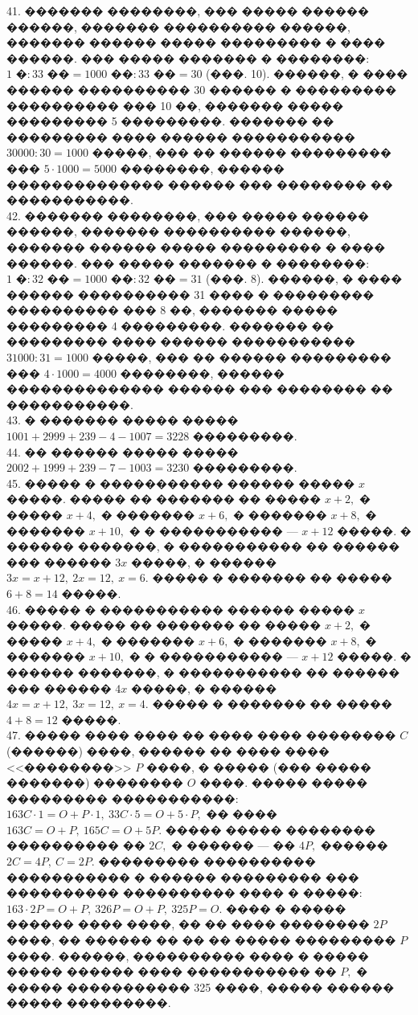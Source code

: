 \documentclass[12pt]{article}
\begin{document}
41. ������� ��������, ��� ����� ������ ������, ������� ���������� ������, ������� ������ ����� ��������� � ���� ������. ��� ����� ������� � ��������:
$1\text{ �}:33\text{ ��}=1000\text{ ��}:33\text{ ��}=30$ (���. 10). ������, � ���� ������ ���������� 30 ������ � ��������� ���������� ��� 10 ��, ������� ����� ��������� 5 ���������. ������� �� ��������� ���� ������ ����������� $30000:30=1000$ �����, ��� �� ������ ��������� ��� $5\cdot1000=5000$ ��������, ������ �������������� ������ ��� �������� �� �����������.\\
42. ������� ��������, ��� ����� ������ ������, ������� ���������� ������, ������� ������ ����� ��������� � ���� ������. ��� ����� ������� � ��������:
$1\text{ �}:32\text{ ��}=1000\text{ ��}:32\text{ ��}=31$ (���. 8). ������, � ���� ������ ���������� 31 ���� � ��������� ���������� ��� 8 ��, ������� ����� ��������� 4 ���������. ������� �� ��������� ���� ������ ����������� $31000:31=1000$ �����, ��� �� ������ ��������� ��� $4\cdot1000=4000$ ��������, ������ �������������� ������ ��� �������� �� �����������.\\
43. � ������� ����� ����� $1001+2999+239-4-1007=3228$ ���������.\\
44. �� ������ ����� ����� $2002+1999+239-7-1003=3230$ ���������.\\
45. ����� � ����������� ������ ����� $x$ �����. ����� �� ������� �� ����� $x+2,$ � ����� $x+4,$ � ������� $x+6,$ � ������� $x+8,$ � ������� $x+10,$ � � ����������� --- $x+12$ �����. � ������ �������, � ����������� �� ������ ��� ������ $3x$ �����, � ������ $3x=x+12,\ 2x=12,\ x=6.$ ����� � ������� �� ����� $6+8=14$ �����.\\
46. ����� � ����������� ������ ����� $x$ �����. ����� �� ������� �� ����� $x+2,$ � ����� $x+4,$ � ������� $x+6,$ � ������� $x+8,$ � ������� $x+10,$ � � ����������� --- $x+12$ �����. � ������ �������, � ����������� �� ������ ��� ������ $4x$ �����, � ������ $4x=x+12,\ 3x=12,\ x=4.$ ����� � ������� �� ����� $4+8=12$ �����.\\
47. ����� ���� ���� �� ���� ���� �������� $C$ (������) ����, ������ �� ���� ���� <<��������>> $P$ ����, � ����� (��� ����� �������) �������� $O$ ����. ����� ����� ��������� �����������: $163C\cdot1=O+P\cdot1,\ 33C\cdot5=O+5\cdot P,$ �� ���� $163C=O+P,\ 165C=O+5P.$ ����� ����� �������� ���������� �� $2C,$ � ������ --- �� $4P,$ ������ $2C=4P,\ C=2P.$ ��������� ���������� ����������� � ������ ��������� ��� ���������� ���������� ���� � �����: $163\cdot2P=O+P,\ 326P=O+P,\ 325P=O.$ ���� � ����� ������ ���� ����, �� �� ���� �������� $2P$ ����, �� ������ �� �� �� ����� ��������� $P$ ����. ������, ���������� ���� � ����� ����� ������ ���� ����������� �� $P,$ � ����� ����������� 325 ����, ����� ������ ����� ���������.\\
\end{document}
